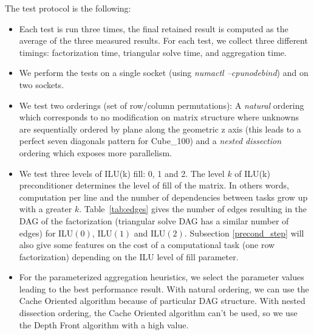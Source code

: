 The test protocol is the following:
\begin{itemize}
\item Each test is run three times, the final retained result is
  computed as the average of the three measured results. For each
  test, we collect three different timings:
  factorization time, triangular solve time, and aggregation time.

\item We perform the tests on a single socket (using
      {\em numactl --cpunodebind}) and on two sockets.

  
\item We test two orderings (set of row/column permutations): A {\em natural} ordering which corresponds to no
      modification on matrix structure where unknowns are sequentially
      ordered by plane along the geometric z axis
      (this leads to a perfect seven diagonals pattern for Cube\_100)
      and a {\em nested dissection}~\cite{Saad96IMSLS} ordering which exposes more parallelism.


\item We test three levels of ILU(k) fill: 0, 1 and 2.
      The level $k$ of ILU(k) preconditioner determines the level of fill of
      the matrix. In others words, computation per line and the number of dependencies
      between tasks grow up with a greater $k$. Table~\ref{tab:edges} gives the number of edges resulting in the DAG of the factorization 
      (triangular solve DAG has a similar number of edges) for ILU$(0)$, ILU$(1)$ and ILU$(2)$. Subsection \ref{precond_step} will also give some features on the cost of a computational task (one row factorization) 
      depending on the ILU level of fill parameter.  

\item For the parameterized aggregation heuristics, we select the
      parameter values leading to the best performance result. With
      natural ordering, we can use the Cache Oriented algorithm because of
      particular DAG structure. With nested dissection ordering, the Cache Oriented algorithm
      can't be used, so we use the Depth Front algorithm with a high value.
\end{itemize}

